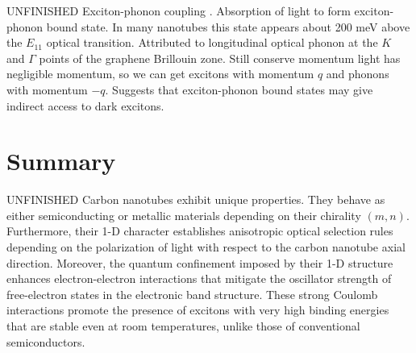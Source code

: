 {\color{red} UNFINISHED} Exciton-phonon coupling \cite{perebeinos2005effect, yu2010phonon, plentz2005direct}. Absorption of light to form exciton-phonon bound state. In many nanotubes this state appears about 200 meV above the $E_{11}$ optical transition. Attributed to longitudinal optical phonon at the $K$ and $\Gamma$ points of the graphene Brillouin zone. Still conserve momentum light has negligible momentum, so we can get excitons with momentum $q$ and phonons with momentum $-q$. Suggests that exciton-phonon bound states may give indirect access to dark excitons. 

\section{Summary}

{\color{red} UNFINISHED} Carbon nanotubes exhibit unique properties. They behave as either semiconducting or metallic materials depending on their chirality $(m,n)$. Furthermore, their 1-D character establishes anisotropic optical selection rules depending on the polarization of light with respect to the carbon nanotube axial direction. Moreover, the quantum confinement imposed by their 1-D structure enhances electron-electron interactions that mitigate the oscillator strength of free-electron states in the electronic band structure. These strong Coulomb interactions promote the presence of excitons with very high binding energies that are stable even at room temperatures, unlike those of conventional semiconductors.
